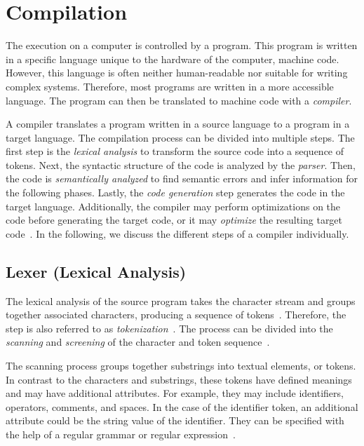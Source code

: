 \section{Compilation}
\label{sec:background_compilation}
The execution on a computer is controlled by a program. This program is written in a specific language unique to the hardware of the computer, machine code. However, this language is often neither human-readable nor suitable for writing complex systems. Therefore, most programs are written in a more accessible language. The program can then be translated to machine code with a \emph{compiler}. 

A compiler translates a program written in a source language to a program in a target language. The compilation process can be divided into multiple steps. The first step is the \emph{lexical analysis} to transform the source code into a sequence of tokens. Next, the syntactic structure of the code is analyzed by the \emph{parser}. Then, the code is \emph{semantically analyzed} to find semantic errors and infer information for the following phases. Lastly, the \emph{code generation} step generates the code in the target language. Additionally, the compiler may perform optimizations on the code before generating the target code, or it may \emph{optimize} the resulting target code~\cite{Oliv07,VSSD07}. In the following, we discuss the different steps of a compiler individually.

\subsection{Lexer (Lexical Analysis)}
\label{sec:background_lexer}
The lexical analysis of the source program takes the character stream and groups together associated characters, producing a sequence of tokens~\cite{Oliv07}. Therefore, the step is also referred to as \emph{tokenization}~\cite{Gref99}. The process can be divided into the \emph{scanning} and \emph{screening} of the character and token sequence~\cite{DeRe74}.

The scanning process groups together substrings into textual elements, or tokens. In contrast to the characters and substrings, these tokens have defined meanings and may have additional attributes. For example, they may include identifiers, operators, comments, and spaces. In the case of the identifier token, an additional attribute could be the string value of the identifier. They can be specified with the help of a regular grammar or regular expression~\cite{DeRe74,VSSD07}.

